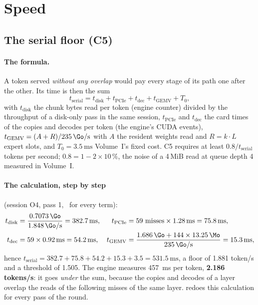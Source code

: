 \section{Speed}\label{t2res-sec:vitesse}

\subsection{The serial floor (C5)}\label{t2res-sec:c5}

\paragraph{The formula.} A token served \emph{without any overlap} would pay every stage of its path one after the other. Its time is then the sum
\[
t_{\text{serial}} = t_{\text{disk}} + t_{\text{PCIe}} + t_{\text{dec}} + t_{\text{GEMV}} + T_0,
\]
with $t_{\text{disk}}$ the chunk bytes read per token (engine counter) divided by the throughput of a disk-only pass in the same session, $t_{\text{PCIe}}$ and $t_{\text{dec}}$ the card times of the copies and decodes per token (the engine's CUDA events), $t_{\text{GEMV}} = (A + R)/\SI{235}{\Go\per\second}$ with $A$ the resident weights read and $R = k \cdot L$ expert slots, and $T_0 = \SI{3.5}{\milli\second}$ Volume~I's fixed cost. C5 requires at least $0.8 / t_{\text{serial}}$ tokens per second; $0.8 = 1 - 2 \times 10\,\%$, the noise of a 4\,MiB read at queue depth 4 measured in Volume~I.

\paragraph{The calculation, step by step} (session O4, pass 1, \mes~for every term):
\begin{align*}
t_{\text{disk}} &= \frac{\SI{0.7073}{\Go}}{\SI{1.848}{\Go\per\second}} = \SI{382.7}{\milli\second}, &
t_{\text{PCIe}} &= 59 \text{ misses} \times \SI{1.28}{\milli\second} = \SI{75.8}{\milli\second}, \\
t_{\text{dec}} &= 59 \times \SI{0.92}{\milli\second} = \SI{54.2}{\milli\second}, &
t_{\text{GEMV}} &= \frac{\SI{1.686}{\Go} + 144 \times \SI{13.25}{\Mo}}{\SI{235}{\Go\per\second}} = \SI{15.3}{\milli\second},
\end{align*}
hence $t_{\text{serial}} = 382.7 + 75.8 + 54.2 + 15.3 + 3.5 = \SI{531.5}{\milli\second}$, a floor of \num{1.881} token/s and a threshold of \num{1.505}. The engine measures \SI{457}{\milli\second} per token, \textbf{\num{2.186} tokens/s}: it goes \emph{under} the sum, because the copies and decodes of a layer overlap the reads of the following misses of the same layer.  redoes this calculation for every pass of the round.


